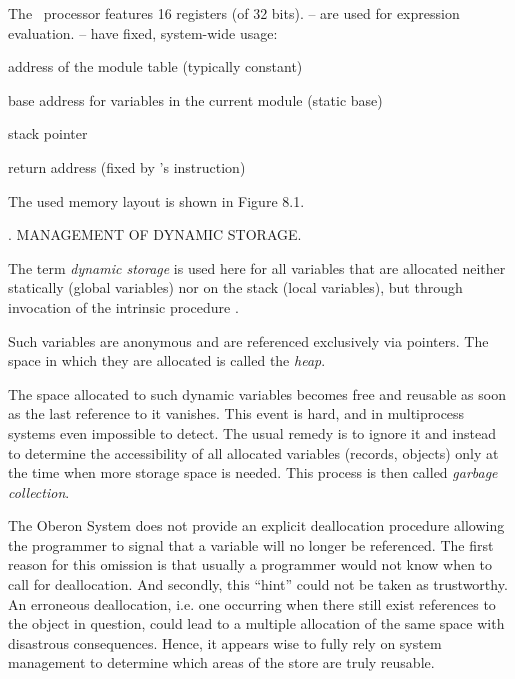 The \RISC\ processor features 16 registers (of 32 bits). -- are used for expression evaluation. -- have fixed, system-wide usage:
{\narrower
\item{} address of the module table  (typically constant)
\item{} base address for variables in the current module  (static base)
\item{} stack pointer 
\item{} return address  (fixed by \RISC's  instruction)

}
\smallskip\noindent The used memory layout is shown in Figure 8.1.


. MANAGEMENT OF DYNAMIC STORAGE.

The term \emph{dynamic storage} is used here for all variables that are allocated neither statically (global variables) nor on the stack (local variables), but through invocation of the intrinsic procedure .

Such variables are anonymous and are referenced exclusively via pointers. The space in which they are allocated is called the \emph{heap}.

The space allocated to such dynamic variables becomes free and reusable as soon as the last reference to it vanishes. This event is hard, and in multiprocess systems even impossible to detect. The usual remedy is to ignore it and instead to determine the accessibility of all allocated variables (records, objects) only at the time when more storage space is needed. This process is then called \emph{garbage collection}.

The Oberon System does not provide an explicit deallocation procedure allowing the programmer to signal that a variable will no longer be referenced. The first reason for this omission is that usually a programmer would not know when to call for deallocation. And secondly, this ``hint'' could not be taken as trustworthy. An erroneous deallocation, i.e. one occurring when there still exist references to the object in question, could lead to a multiple allocation of the same space with disastrous consequences. Hence, it appears wise to fully rely on system management to determine which areas of the store are truly reusable.

